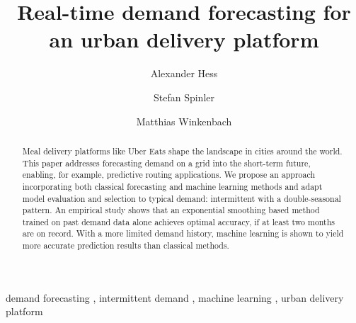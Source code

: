 \begin{frontmatter}

\title{Real-time demand forecasting for an urban delivery platform}

\author[WHU]{Alexander Hess}
\author[WHU]{Stefan Spinler}
\author[MIT]{Matthias Winkenbach}
\address[WHU]{
WHU - Otto Beisheim School of Management,
Burgplatz 2, 56179 Vallendar, Germany
}
\address[MIT]{
Massachusetts Institute of Technology,
77 Massachusetts Avenue, Cambridge, MA 02139, United States
}


\begin{abstract}
Meal delivery platforms like Uber Eats shape the landscape in cities around the world.
This paper addresses forecasting demand on a grid into the short-term future,
    enabling, for example, predictive routing applications.
We propose an approach incorporating
    both classical forecasting and machine learning methods
    and adapt model evaluation and selection to typical demand:
        intermittent with a double-seasonal pattern.
An empirical study shows that
    an exponential smoothing based method trained on past demand data alone
        achieves optimal accuracy,
    if at least two months are on record.
With a more limited demand history,
    machine learning is shown
    to yield more accurate prediction results than classical methods.
\end{abstract}

\begin{keyword}
demand forecasting \sep
intermittent demand \sep
machine learning \sep
urban delivery platform
\end{keyword}

\end{frontmatter}